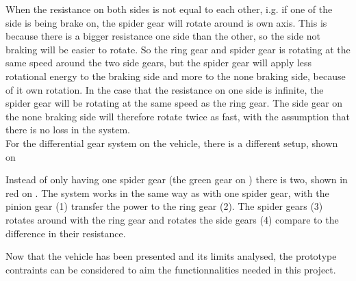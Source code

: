 When the resistance on both sides is not equal to each other, i.g. if one of the side is being brake on, the spider gear will rotate around is own axis. This is because there is a bigger resistance one side than the other, so the side not braking will be easier to rotate. So the ring gear and spider gear is rotating at the same speed around the two side gears, but the spider gear will apply less rotational energy to the braking side and more to the none braking side, because of it own rotation. In the case that the resistance on one side is infinite, the spider gear will be rotating at the same speed as the ring gear. The side gear on the none braking side will therefore rotate twice as fast, with the assumption that there is no loss in the system.\\

For the differential gear system on the vehicle, there is a different setup, shown on 











Instead of only having one spider gear (the green gear on ) there is two, shown in red on . The system works in the same way as with one spider gear, with the pinion gear (1) transfer the power to the ring gear (2). The spider gears (3) rotates around with the ring gear and rotates the side gears (4) compare to the difference in their resistance.

Now that the vehicle has been presented and its limits analysed, the prototype contraints can be considered to aim the functionnalities needed in this project.

